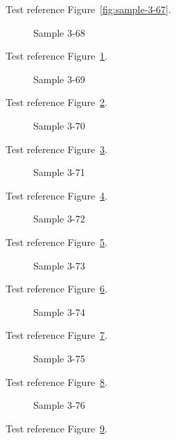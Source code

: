 Test reference Figure~\ref{fig:sample-3-67}.

\begin{figure}[tbhp]
\caption{Sample 3-68}
\label{fig:sample-3-68}
\end{figure}

Test reference Figure~\ref{fig:sample-3-68}.

\begin{figure}[tbhp]
\caption{Sample 3-69}
\label{fig:sample-3-69}
\end{figure}

Test reference Figure~\ref{fig:sample-3-69}.

\begin{figure}[tbhp]
\caption{Sample 3-70}
\label{fig:sample-3-70}
\end{figure}

Test reference Figure~\ref{fig:sample-3-70}.

\begin{figure}[tbhp]
\caption{Sample 3-71}
\label{fig:sample-3-71}
\end{figure}

Test reference Figure~\ref{fig:sample-3-71}.

\begin{figure}[tbhp]
\caption{Sample 3-72}
\label{fig:sample-3-72}
\end{figure}

Test reference Figure~\ref{fig:sample-3-72}.

\begin{figure}[tbhp]
\caption{Sample 3-73}
\label{fig:sample-3-73}
\end{figure}

Test reference Figure~\ref{fig:sample-3-73}.

\begin{figure}[tbhp]
\caption{Sample 3-74}
\label{fig:sample-3-74}
\end{figure}

Test reference Figure~\ref{fig:sample-3-74}.

\begin{figure}[tbhp]
\caption{Sample 3-75}
\label{fig:sample-3-75}
\end{figure}

Test reference Figure~\ref{fig:sample-3-75}.

\begin{figure}[tbhp]
\caption{Sample 3-76}
\label{fig:sample-3-76}
\end{figure}

Test reference Figure~\ref{fig:sample-3-76}.

